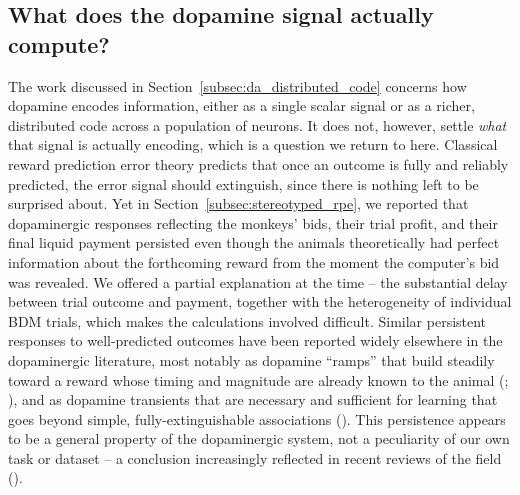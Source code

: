 \subsection{What does the dopamine signal actually compute?}\label{subsec:what_does_da_compute}

The work discussed in Section~\ref{subsec:da_distributed_code} concerns how dopamine encodes information, either as a single scalar signal or as a richer, distributed code across a population of neurons. It does not, however, settle \textit{what} that signal is actually encoding, which is a question we return to here. Classical reward prediction error theory predicts that once an outcome is fully and reliably predicted, the error signal should extinguish, since there is nothing left to be surprised about. Yet in Section~\ref{subsec:stereotyped_rpe}, we reported that dopaminergic responses reflecting the monkeys' bids, their trial profit, and their final liquid payment persisted even though the animals theoretically had perfect information about the forthcoming reward from the moment the computer's bid was revealed. We offered a partial explanation at the time -- the substantial delay between trial outcome and payment, together with the heterogeneity of individual BDM trials, which makes the calculations involved difficult. Similar persistent responses to well-predicted outcomes have been reported widely elsewhere in the dopaminergic literature, most notably as dopamine ``ramps'' that build steadily toward a reward whose timing and magnitude are already known to the animal (\cite{howeProlongedDopamineSignalling2013}; \cite{hamidMesolimbicDopamineSignals2016}), and as dopamine transients that are necessary and sufficient for learning that goes beyond simple, fully-extinguishable associations (\cite{sharpeDopamineTransientsAre2017}). This persistence appears to be a general property of the dopaminergic system, not a peculiarity of our own task or dataset -- a conclusion increasingly reflected in recent reviews of the field (\cite{kahntCuriousCaseDopaminergic2025}).


